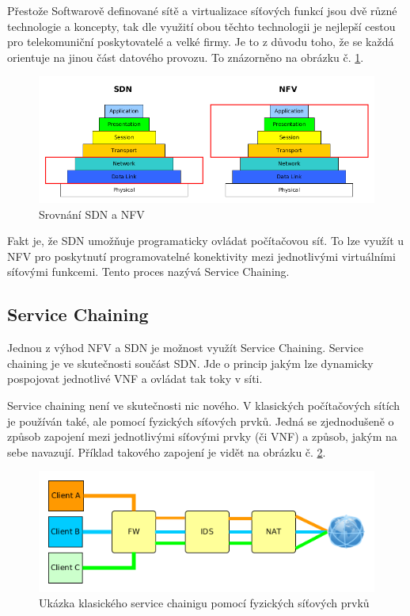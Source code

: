 Přestože Softwarově definované sítě a virtualizace síťových funkcí jsou dvě různé technologie a koncepty, tak dle \cite{Toward_NFV} využití obou těchto technologii je nejlepší cestou pro telekomuniční poskytovatelé a velké firmy. Je to z důvodu toho, že se každá orientuje na jinou část datového provozu. To znázorněno na obrázku č. \ref{fig:sdn_nfv}.

\begin{figure}[h]
\begin{centering}
\includegraphics[scale=0.5]{images/sdn_nfv}
\par\end{centering}
\caption{ Srovnání SDN a NFV \label{fig:sdn_nfv}}
\end{figure}

Fakt je, že SDN umožňuje programaticky ovládat počítačovou síť. To lze využít u NFV pro poskytnutí programovatelné konektivity mezi jednotlivými virtuálními síťovými funkcemi. Tento proces nazývá Service Chaining.

\subsection{Service Chaining} \label{sub:SDN}

Jednou z výhod NFV a SDN je možnost využít Service Chaining. Service chaining je ve skutečnosti součást SDN. Jde o princip jakým lze dynamicky pospojovat jednotlivé VNF a ovládat tak toky v síti. \cite{NFV_simplified}

Service chaining není ve skutečnosti nic nového. V klasických počítačových sítích je používán také, ale pomocí fyzických síťových prvků. Jedná se zjednodušeně o způsob zapojení mezi jednotlivými síťovými prvky (či VNF) a způsob, jakým na sebe navazují. Příklad takového zapojení je vidět na obrázku č. \ref{fig:service_chaining}. 

\begin{figure}[h]
\begin{centering}
\includegraphics[scale=0.55]{images/service_chaining}
\par\end{centering}
\caption{Ukázka klasického service chainigu pomocí fyzických síťových prvků\label{fig:service_chaining}}
\end{figure}

